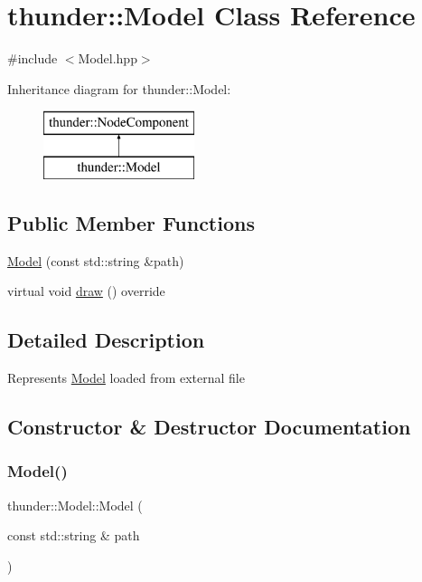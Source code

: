 \hypertarget{classthunder_1_1_model}{}\section{thunder\+:\+:Model Class Reference}
\label{classthunder_1_1_model}


{\ttfamily \#include $<$Model.\+hpp$>$}

Inheritance diagram for thunder\+:\+:Model\+:\begin{figure}[H]
\begin{center}
\leavevmode
\includegraphics[height=2.000000cm]{classthunder_1_1_model}
\end{center}
\end{figure}
\subsection*{Public Member Functions}
\begin{DoxyCompactItemize}
\item 
\mbox{\hyperlink{classthunder_1_1_model_a68d9acae8666185090f10bb716dde042}{Model}} (const std\+::string \&path)
\item 
virtual void \mbox{\hyperlink{classthunder_1_1_model_ab85c39eee0286fb332250b46c8315c76}{draw}} () override
\end{DoxyCompactItemize}


\subsection{Detailed Description}
Represents \mbox{\hyperlink{classthunder_1_1_model}{Model}} loaded from external file 

\subsection{Constructor \& Destructor Documentation}
\mbox{\label{classthunder_1_1_model_a68d9acae8666185090f10bb716dde042}} 
\subsubsection{\texorpdfstring{Model()}{Model()}}
{\footnotesize\ttfamily thunder\+::\+Model\+::\+Model (\begin{DoxyParamCaption}\item[{const std\+::string \&}]{path }\end{DoxyParamCaption})}


